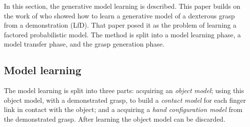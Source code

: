 In this section, the generative model learning is described. This paper builds on the work of \citet{kopicki2015ijrr} who showed how to learn a generative model of a dexterous grasp from a demonstration (LfD). That paper posed it as the problem of learning a factored probabilistic model. The method is split into a model learning phase, a model transfer phase, and the grasp generation phase. 

\subsection{Model learning}
The model learning is split into three parts: acquiring an {\em object model}; using this object model, with a demonstrated grasp, to build a {\em contact model} for each finger link in contact with the object; and a acquiring a {\em hand configuration model} from the demonstrated grasp. After learning the object model can be discarded.

